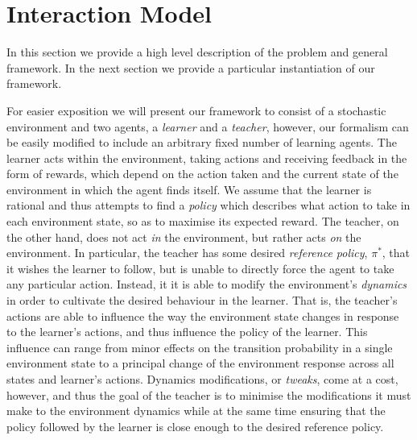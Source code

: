

\section{Interaction Model}\label{sec: GeneralModel}

In this section we provide a high level description of the problem and
general framework.  In the next section we provide a particular
instantiation of our framework.

For easier exposition we will present our framework to consist of a
stochastic environment and two agents, a \emph{learner} and a
\emph{teacher}, however, our formalism can be easily modified to
include an arbitrary fixed number of learning agents. The learner acts
within the environment, taking actions and receiving feedback in the
form of rewards, which depend on the action taken and the current
state of the environment in which the agent finds itself.  We assume
that the learner is rational and thus attempts to find a \emph{policy}
which describes what action to take in each environment state, so as
to maximise its expected reward.  The teacher, on the other hand,
does not act \emph{in} the environment, but rather acts \emph{on} the
environment.  In particular, the teacher has some desired
\emph{reference policy}, $\pi^*$, that it wishes the learner to
follow, but is unable to directly force the agent to take any
particular action.  Instead, it it is able to modify the environment's
\emph{dynamics} in order to cultivate the desired behaviour in the
learner.  That is, the teacher's actions are able to influence the way
the environment state changes in response to the learner's actions,
and thus influence the policy of the learner. This influence can range
from minor effects on the transition probability in a single
environment state to a principal change of the environment response
across all states and learner's actions. Dynamics modifications, or
\emph{tweaks}, come at a cost, however, and thus the goal of the
teacher is to minimise the modifications it must make to the
environment dynamics while at the same time ensuring that the policy
followed by the learner is close enough to the desired reference
policy.

